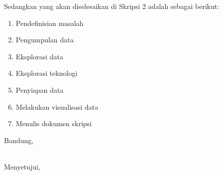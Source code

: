 \documentclass[a4paper,twoside]{article}
\begin{document}
	Sedangkan yang akan diselesaikan di Skripsi 2 adalah sebagai berikut:
	\begin{enumerate}
		\item Pendefinisian masalah
		\item Pengumpulan data
		\item Eksplorasi data
		\item Eksplorasi teknologi
		\item Penyiapan data
		\item Melakukan visualisasi data
		\item Menulis dokumen skripsi
	\end{enumerate}
	
	\vspace{1cm}
	\centering Bandung, \tanggal\\
	\vspace{2cm} \nama \\ 
	\vspace{1cm}
	
	Menyetujui, \\
\end{document}
